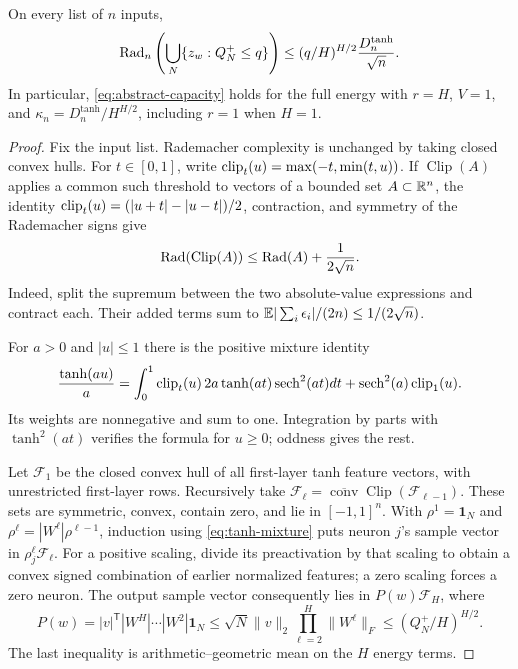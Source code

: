 \begin{lemma}
\label{lem:tanh-capacity}
On every list of $n$ inputs,
\begin{equation}
 \operatorname{Rad}_n\left(\bigcup_N\{z_w:Q_N^+\le q\}\right)
 \le (q/H)^{H/2}\frac{D_n^{\tanh}}{\sqrt n}.
 \label{eq:tanh-capacity}
\end{equation}
In particular, \eqref{eq:abstract-capacity} holds for the full energy with $r=H$, $V=1$, and $\kappa_n=D_n^{\tanh}/H^{H/2}$, including $r=1$ when $H=1$.
\end{lemma}
\begin{proof}
Fix the input list. Rademacher complexity is unchanged by taking closed convex hulls. For $t\in[0,1]$, write $\operatorname{clip}_t(u)=\max(-t,\min(t,u))$. If $\operatorname{Clip}(A)$ applies a common such threshold to vectors of a bounded set $A\subset\mathbb R^n$, the identity
$\operatorname{clip}_t(u)=(|u+t|-|u-t|)/2$, contraction, and symmetry of the Rademacher signs give
\begin{equation}
 \operatorname{Rad}(\operatorname{Clip}(A))\le\operatorname{Rad}(A)+\frac1{2\sqrt n}.
 \label{eq:variable-clip}
\end{equation}
Indeed, split the supremum between the two absolute-value expressions and contract each. Their added terms sum to
$\mathbb E|\sum_i\epsilon_i|/(2n)\le1/(2\sqrt n)$.

For $a>0$ and $|u|\le1$ there is the positive mixture identity
\begin{equation}
 \frac{\tanh(au)}a=
 \int_0^1\operatorname{clip}_t(u)\,2a\tanh(at)\operatorname{sech}^2(at)dt
 +\operatorname{sech}^2(a)\operatorname{clip}_1(u).
 \label{eq:tanh-mixture}
\end{equation}
Its weights are nonnegative and sum to one. Integration by parts with $\tanh^2(at)$ verifies the formula for $u\ge0$; oddness gives the rest.

Let $\mathcal F_1$ be the closed convex hull of all first-layer tanh feature vectors, with unrestricted first-layer rows. Recursively take
$\mathcal F_\ell=\overline{\operatorname{conv}}\operatorname{Clip}(\mathcal F_{\ell-1})$. These sets are symmetric, convex, contain zero, and lie in $[-1,1]^n$. With $\rho^1=\boldsymbol1_N$ and
$\rho^\ell=|W^\ell|\rho^{\ell-1}$, induction using \eqref{eq:tanh-mixture} puts neuron $j$'s sample vector in $\rho^\ell_j\mathcal F_\ell$. For a positive scaling, divide its preactivation by that scaling to obtain a convex signed combination of earlier normalized features; a zero scaling forces a zero neuron.
The output sample vector consequently lies in
$P(w)\mathcal F_H$, where
\[
 P(w)=|v|^{\mathsf T}|W^H|\cdots|W^2|\boldsymbol1_N
 \le\sqrt N\|v\|_2\prod_{\ell=2}^H\|W^\ell\|_F
 \le(Q_N^+/H)^{H/2}.
\]
The last inequality is arithmetic--geometric mean on the $H$ energy terms.


\end{proof}
